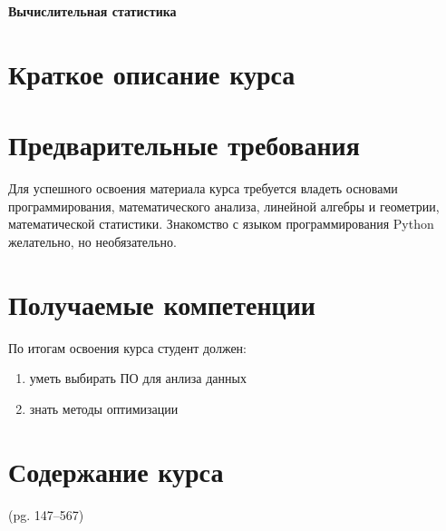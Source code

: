 \documentclass{article}
\begin{document}
{\LARGE \bf Вычислительная статистика}

\section{Краткое описание курса}


\section{Предварительные требования}
Для успешного освоения материала курса требуется владеть основами программирования, математического анализа, линейной алгебры и геометрии, математической статистики. Знакомство с языком программирования Python желательно, но необязательно.

\section{Получаемые компетенции}
По итогам освоения курса студент должен:
\begin{enumerate}
\item уметь выбирать ПО для анлиза данных
\item знать методы оптимизации
\end{enumerate}

\section{Содержание курса}



(pg. 147--567)
\end{document}
